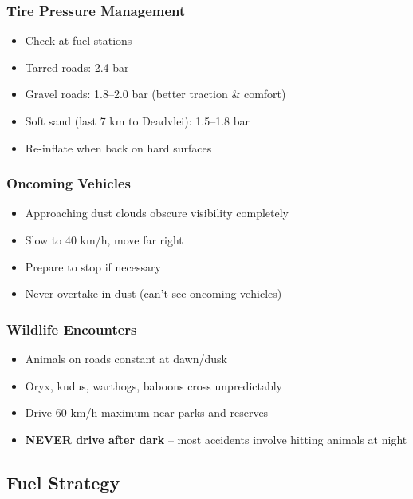 \documentclass[11pt]{article}
\begin{document}
\clearpage
\subsubsection{Tire Pressure Management}

\begin{itemize}
    \item Check at fuel stations
    \item Tarred roads: 2.4 bar
    \item Gravel roads: 1.8--2.0 bar (better traction \& comfort)
    \item Soft sand (last 7 km to Deadvlei): 1.5--1.8 bar
    \item Re-inflate when back on hard surfaces
\end{itemize}

\subsubsection{Oncoming Vehicles}

\begin{itemize}
    \item Approaching dust clouds obscure visibility completely
    \item Slow to 40 km/h, move far right
    \item Prepare to stop if necessary
    \item Never overtake in dust (can't see oncoming vehicles)
\end{itemize}

\subsubsection{Wildlife Encounters}

\begin{itemize}
    \item Animals on roads constant at dawn/dusk
    \item Oryx, kudus, warthogs, baboons cross unpredictably
    \item Drive 60 km/h maximum near parks and reserves
    \item \textcolor{warningcolor}{\textbf{NEVER drive after dark}} -- most accidents involve hitting animals at night
\end{itemize}

\subsection{Fuel Strategy}
\end{document}
